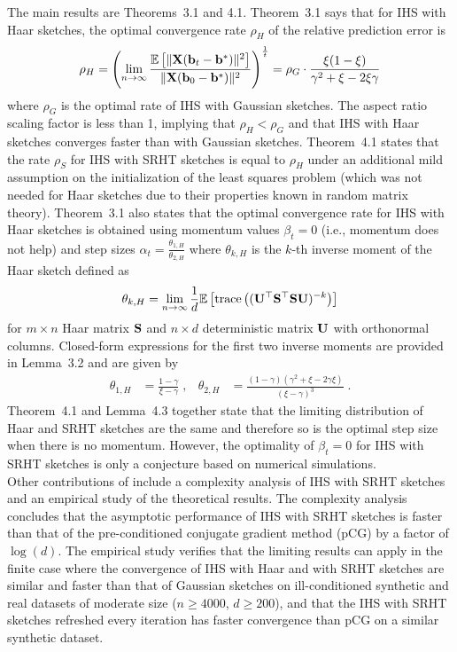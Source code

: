 The main results are Theorems~3.1 and 4.1. Theorem~3.1 says that for IHS with Haar sketches, the optimal convergence rate $\rho_H$ of the relative prediction error is
\[
\rho_H  = \left(\lim_{n\rightarrow\infty}\frac{\mathbb{E}\left[\|\mathbf{X}(\mathbf{b}_t-\mathbf{b}^*)\|^2\right]}{\|\mathbf{X}(\mathbf{b}_0-\mathbf{b}^*)\|^2}\right)^\frac{1}{t} = \rho_G\cdot\frac{\xi(1-\xi)}{\gamma^2+\xi-2\xi\gamma}
\]
where $\rho_G$ is the optimal rate of IHS with Gaussian sketches. The aspect ratio scaling factor is less than 1, implying that $\rho_H<\rho_G$ and that IHS with Haar sketches converges faster than with Gaussian sketches.  Theorem~4.1 states that the rate $\rho_S$ for IHS with SRHT sketches is equal to $\rho_H$ under an additional mild assumption on the initialization of the least squares problem (which was not needed for Haar sketches due to their properties known in random matrix theory). Theorem~3.1 also states that the optimal convergence rate for IHS with Haar sketches is obtained using momentum values $\beta_t=0$ (i.e., momentum does not help) and step sizes $\alpha_t = \frac{\theta_{1,H}}{\theta_{2,H}}$ where $\theta_{k,H}$ is the $k$-th inverse moment of the Haar sketch defined as
\[
\theta_{k,H} = \lim_{n\rightarrow\infty}\frac{1}{d}\mathbb{E}\left[\mathrm{trace}\left((\mathbf{U}^\top\mathbf{S}^\top\mathbf{S}\mathbf{U})^{-k}\right)\right]
\]
for $m\times n$ Haar matrix $\mathbf{S}$ and $n\times d$ deterministic matrix $\mathbf{U}$ with orthonormal columns. Closed-form expressions for the first two inverse moments are provided in Lemma~3.2 and are given by
\begin{align*}
\theta_{1,H} &= \frac{1-\gamma}{\xi-\gamma} \;, & \theta_{2,H} &= \frac{(1-\gamma)(\gamma^2+\xi-2\gamma\xi)}{(\xi-\gamma)^3} \;.
\end{align*}
Theorem~4.1 and Lemma~4.3 together state that the limiting distribution of Haar and SRHT sketches are the same and therefore so is the optimal step size when there is no momentum. However, the optimality of $\beta_t=0$ for IHS with SRHT sketches is only a conjecture based on numerical simulations.
\\

Other contributions of \citet{Lacotte:2020} include a complexity analysis of IHS with SRHT sketches and an empirical study of the theoretical results. The complexity analysis concludes that the asymptotic performance of IHS with SRHT sketches is faster than that of the pre-conditioned conjugate gradient method (pCG) \citep{Rokhlin:2008} by a factor of $\log(d)$. The empirical study verifies that the limiting results can apply in the finite case where the convergence of IHS with Haar and with SRHT sketches are similar and faster than that of Gaussian sketches on ill-conditioned synthetic and real datasets of moderate size ($n\geq 4000$, $d\geq 200$), and that the IHS with SRHT sketches refreshed every iteration has faster convergence than pCG on a similar synthetic dataset.


